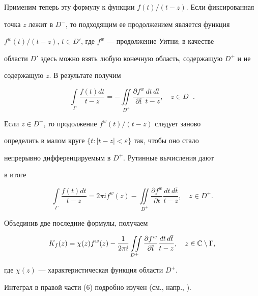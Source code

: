 Применим теперь эту формулу к функции $f(t)/(t - z)$. Если фиксированная


точка $z$ лежит в $D^-$, то подходящим ее продолжением является функция


$f^{w}(t)/(t - z)$, $t\in D'$, где $f^w$ --- продолжение Уитни; в качестве


области $D'$ здесь можно взять любую конечную область, содержащую $D^+$ и не


содержащую $z$. В результате получим


$$


\int\limits_{\Gamma}{\frac{f(t)dt}{t-z}} = -


\iint\limits_{D^{+}}


{\frac{\partial f^{w}}{\partial\overline{t}}\frac{dt\,d\overline{t}}{t-z}},


\quad z\in D^-.


$$


Если $z\in D^-$, то продолжение $f^{w}(t)/(t - z)$ следует заново


определить в малом круге $\{t:|t-z|<\varepsilon\}$ так, чтобы оно стало


непрерывно дифференцируемым в $D^+$. Рутинные вычисления дают


в итоге


$$


\int\limits_{\Gamma}{\frac{f(t)dt}{t-z}} = 2\pi i f^{w}(z) -


\iint\limits_{D^{+}}


{\frac{\partial f^{w}}{\partial\overline{t}}\frac{dt\,d\overline{t}}{t-z}},


\quad z\in D^+.


$$


Объединив две последние формулы, получаем


\begin{equation}


K_{f}(z) = \chi (z)f^{w}(z) - \frac{1}{2\pi i}


\iint\limits_{D^{+}}


{\frac{\partial f^{w}}{\partial\overline{t}}\frac{dt\,d\overline{t}}{t-z}},


\quad z\in{\Bbb C}\setminus\Gamma,


\end{equation}


где $\chi (z)$ --- характеристическая функция области $D^+$.


Интеграл в правой части (6) подробно изучен (см., напр., \cite{V}).


